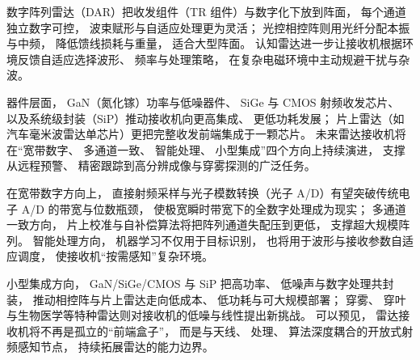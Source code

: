 数字阵列雷达（DAR）把收发组件（TR 组件）与数字化下放到阵面，
每个通道独立数字可控，
波束赋形与自适应处理更为灵活；
光控相控阵则用光纤分配本振与中频，
降低馈线损耗与重量，
适合大型阵面。
认知雷达进一步让接收机根据环境反馈自适应选择波形、
频率与处理策略，
在复杂电磁环境中主动规避干扰与杂波。

器件层面，
GaN（氮化镓）功率与低噪器件、
SiGe 与 CMOS 射频收发芯片、
以及系统级封装（SiP）推动接收机向更高集成、
更低功耗发展；
片上雷达（如汽车毫米波雷达单芯片）更把完整收发前端集成于一颗芯片。
未来雷达接收机将在“宽带数字、
多通道一致、
智能处理、
小型集成”四个方向上持续演进，
支撑从远程预警、
精密跟踪到高分辨成像与穿雾探测的广泛任务。

在宽带数字方向上，
直接射频采样与光子模数转换（光子 A/D）有望突破传统电子 A/D 的带宽与位数瓶颈，
使极宽瞬时带宽下的全数字处理成为现实；
多通道一致方向，
片上校准与自补偿算法将把阵列通道失配压到更低，
支撑超大规模阵列。
智能处理方向，
机器学习不仅用于目标识别，
也将用于波形与接收参数自适应调度，
使接收机“按需感知”复杂环境。

小型集成方向，
GaN/SiGe/CMOS 与 SiP 把高功率、
低噪声与数字处理共封装，
推动相控阵与片上雷达走向低成本、
低功耗与可大规模部署；
穿雾、
穿叶与生物医学等特种雷达则对接收机的低噪与线性提出新挑战。
可以预见，
雷达接收机将不再是孤立的“前端盒子”，
而是与天线、
处理、
算法深度耦合的开放式射频感知节点，
持续拓展雷达的能力边界。
